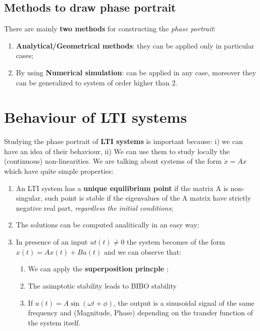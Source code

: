 \subsection{Methods to draw phase portrait}
There are mainly \textbf{two methods} for constructing the \textit{phase portrait}: 
\begin{enumerate}
    \item \textbf{Analytical/Geometrical methods}: they can be applied only in particular cases; 
    \item By using \textbf{Numerical simulation}: can be applied in any case, moreover they can be generalized to system of order higher than 2.
\end{enumerate}

\section{Behaviour of LTI systems}
Studying the phase portrait of \textbf{LTI systems} is important because: i) we can have an idea of their behaviour, ii) We can use them to study locally the (continuous) non-linearities. We are talking about systems of the form $\dot{x}=Ax$ which have quite simple properties: 
\begin{enumerate}
    \item An LTI system has a \textbf{unique equilibrium point} if the matrix A is non-singular, such point is stable if the eigenvalues of the A matrix have strictly negative real part, \textit{regardless the initial conditions}; 
    \item The solutions can be computed analitically in an easy way; 
    \item In presence of an input $ut(t) \ne 0$ the system becomes of the form $\dot{x(t)}=Ax(t)+Bu(t)$ and we can observe that: 
    \begin{enumerate}
        \item We can apply the \textbf{superposition princple }; 
        \item The asimptotic stability leads to BIBO stability
        \item If $u(t)=A\sin(\omega t + \phi)$, the output is a sinusoidal signal of the same frequency and (Magnitude, Phase) depending on the transfer function of the system itself.
    \end{enumerate}
\end{enumerate}

